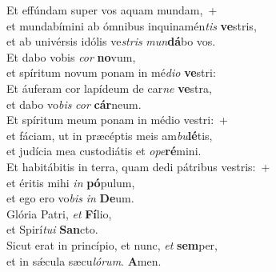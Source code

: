 \evenverse Et effúndam super vos aquam mundam,~+\\\evenverse  et mundabímini ab ómnibus inquinamén\textit{tis} \textbf{ve}stris,~\*\\
\evenverse et ab univérsis idólis ve\textit{stris} \textit{mun}\textbf{dá}bo vos.\\
\oddverse Et dabo vobis \textit{cor} \textbf{no}vum,~\*\\
\oddverse et spíritum novum ponam in mé\textit{di}\textit{o} \textbf{ve}stri:\\
\evenverse Et áuferam cor lapídeum de car\textit{ne} \textbf{ve}stra,~\*\\
\evenverse et dabo vo\textit{bis} \textit{cor} \textbf{cár}neum.\\
\oddverse Et spíritum meum ponam in médio vestri:~+\\
\oddverse  et fáciam, ut in præcéptis meis am\textit{bu}\textbf{lé}tis,~\*\\
\oddverse et judícia mea custodiátis et \textit{o}\textit{pe}\textbf{ré}mini.\\
\evenverse Et habitábitis in terra, quam dedi pátribus vestris:~+\\
\evenverse  et éritis mihi \textit{in} \textbf{pó}pulum,~\*\\
\evenverse et ego ero vo\textit{bis} \textit{in} \textbf{De}um.\\
\oddverse Glória Patri, \textit{et} \textbf{Fí}lio,~\*\\
\oddverse et Spirí\textit{tu}\textit{i} \textbf{San}cto.\\
\evenverse Sicut erat in princípio, et nunc, \textit{et} \textbf{sem}per,~\*\\
\evenverse et in sǽcula sæcu\textit{ló}\textit{rum}. \textbf{A}men.\\
